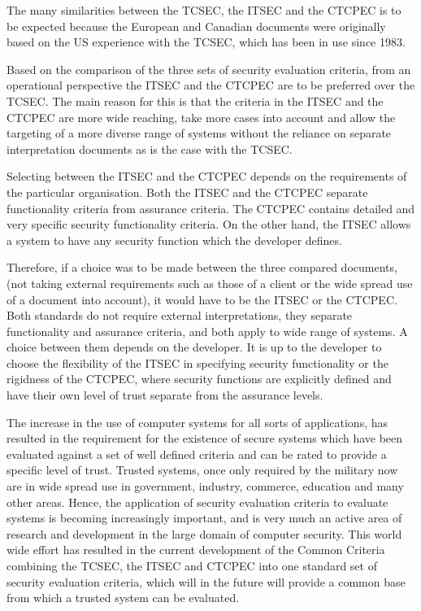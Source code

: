 The many similarities between the TCSEC, the ITSEC and the CTCPEC is to
be expected because the European and Canadian documents were
originally based on the US experience with the TCSEC, which has been in
use since 1983.

Based on the comparison of the three sets of security evaluation
criteria, from an operational perspective the ITSEC and the CTCPEC are
to be preferred over the TCSEC. The main reason for this is that the
criteria in the ITSEC and the CTCPEC are more wide reaching, take more
cases into account and allow the targeting of a more diverse range of
systems without the reliance on separate interpretation documents as is
the case with the TCSEC. 

Selecting between the ITSEC and the CTCPEC
depends on the requirements of the particular organisation. 
Both the ITSEC and the CTCPEC separate functionality criteria from assurance
criteria. The CTCPEC contains detailed and very specific security functionality
criteria. On the other hand, the ITSEC allows a system to have any security
function which the developer defines.

Therefore, if a choice was to be made between the three compared
documents, (not taking external requirements such as those of a client or
the wide spread use of a document into account), it would have to be the
ITSEC or the CTCPEC. Both standards do not require external interpretations,
they separate functionality and assurance criteria, and both apply to wide
range of systems. A choice between them depends on the developer. 
It is up to the developer to choose the flexibility of the ITSEC in specifying
security functionality or the rigidness of the CTCPEC, where security functions
are explicitly defined and have their own level of trust separate from the assurance levels.

The increase in the use of computer systems for all sorts of
applications, has resulted in the requirement for the existence of 
secure systems which have been evaluated against a set of
well defined criteria and can be rated to provide a specific level of
trust. Trusted systems, once only required by the military now are in
wide spread use in government, industry, commerce, education and many
other areas. Hence, the application of security evaluation criteria 
to evaluate systems is becoming increasingly important, and is very much
an active area of research and development in the large domain of
computer security. This world wide effort has resulted in the current development of the
Common Criteria combining the TCSEC, the ITSEC and CTCPEC into one
standard set of security evaluation criteria, which will in the future
will provide a common base from which a trusted system can be evaluated.

